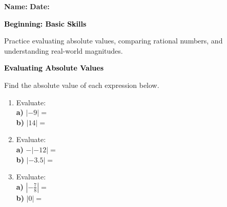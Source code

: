 \documentclass[12pt, letterpaper, fleqn]{article}
\newcommand{\blank}{\underline{\hspace{2.2cm}}}
\begin{document}
\textbf{Name:} \underline{\hspace{5cm}}
\hfill
\textbf{Date:} \underline{\hspace{3cm}}\\

\begin{tcolorbox}[colback=black!10]
    \large\textcolor{black}{\textbf{Beginning: Basic Skills}}
\end{tcolorbox}

\vspace{3mm}

\noindent
Practice evaluating absolute values, comparing rational numbers, and understanding real-world magnitudes.

\vspace{4mm}

\begin{tcolorbox}[colback=black!10]
\large\textcolor{black}{\textbf{Evaluating Absolute Values}}
\end{tcolorbox}

\noindent
Find the absolute value of each expression below.

\vspace{3mm}

\begin{enumerate}[itemsep=2.2cm, leftmargin=0.6cm]

\item Evaluate: \\
\textbf{a)} $|-9| = $ \blank \\
\textbf{b)} $|14| = $ \blank

\vspace{2cm}

\item Evaluate: \\
\textbf{a)} $-|-12| = $ \blank \\
\textbf{b)} $|-3.5| = $ \blank

\vspace{2cm}

\item Evaluate: \\
\textbf{a)} $|-\frac{7}{8}| = $ \blank \\
\textbf{b)} $|0| = $ \blank

\vspace{2cm}

\end{enumerate}
\end{document}
